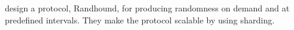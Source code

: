 \item[Scalable Bias-Resistant Distributed Randomness]
\citet{syta2017scalable} design a protocol, Randhound, for producing randomness on demand and at predefined intervals. They make the protocol scalable by using sharding. 